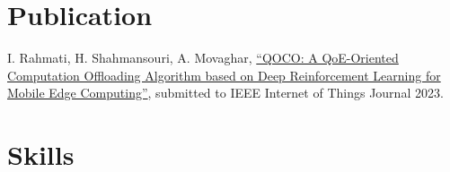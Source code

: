 \documentclass[11pt]{article}
\begin{document}
\section {Publication}
 I. Rahmati, H. Shahmansouri, A. Movaghar, \href{https://arxiv.org/pdf/2311.02525.pdf}{``QOCO: A QoE-Oriented Computation Offloading Algorithm based on Deep Reinforcement Learning for Mobile Edge Computing''}, submitted to IEEE Internet of Things Journal 2023.



\section{Skills}


\end{document}
